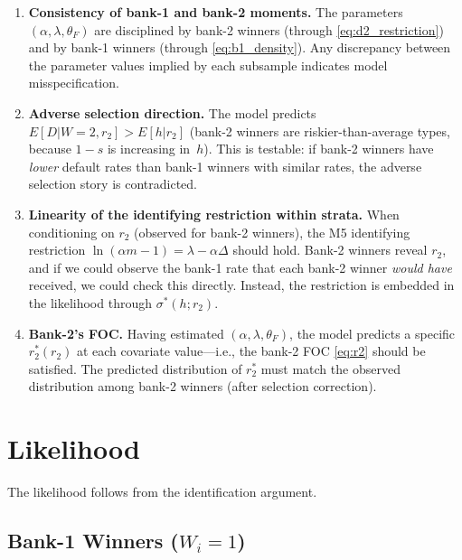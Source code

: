 \documentclass[12pt]{article}
\theoremstyle{plain}
\theoremstyle{plain}
\theoremstyle{definition}  %
\theoremstyle{remark}  %
\begin{document}
\begin{enumerate}
    \item \textbf{Consistency of bank-1 and bank-2 moments.}  The parameters $(\alpha, \lambda, \theta_F)$ are disciplined by bank-2 winners (through \eqref{eq:d2_restriction}) and by bank-1 winners (through \eqref{eq:b1_density}).  Any discrepancy between the parameter values implied by each subsample indicates model misspecification.
    
    \item \textbf{Adverse selection direction.}  The model predicts $E[D|W\!=\!2, r_2] > E[h|r_2]$ (bank-2 winners are riskier-than-average types, because $1-s$ is increasing in~$h$).  This is testable: if bank-2 winners have \emph{lower} default rates than bank-1 winners with similar rates, the adverse selection story is contradicted.
    
    \item \textbf{Linearity of the identifying restriction within strata.}  When conditioning on $r_2$ (observed for bank-2 winners), the M5 identifying restriction $\ln(\alpha m - 1) = \lambda - \alpha\Delta$ should hold.  Bank-2 winners reveal $r_2$, and if we could observe the bank-1 rate that each bank-2 winner \emph{would have} received, we could check this directly.  Instead, the restriction is embedded in the likelihood through $\sigma^*(h;r_2)$.
    
    \item \textbf{Bank-2's FOC.}  Having estimated $(\alpha, \lambda, \theta_F)$, the model predicts a specific $r_2^*(r_2)$ at each covariate value---i.e., the bank-2 FOC \eqref{eq:r2} should be satisfied.  The predicted distribution of $r_2^*$ must match the observed distribution among bank-2 winners (after selection correction).
\end{enumerate}



\newpage
\section{Likelihood}\label{sec:likelihood}

The likelihood follows from the identification argument.

\subsection{Bank-1 Winners ($W_i = 1$)}
\end{document}
